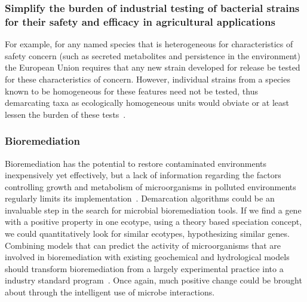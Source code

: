 \subsubsection*{Simplify the burden of industrial testing of bacterial strains for their safety and efficacy in agricultural applications}
For example, for any named species that is heterogeneous for characteristics of safety concern (such as secreted metabolites and persistence in the environment) the European Union requires that any new strain developed for release be tested for these characteristics of concern.
However, individual strains from a species known to be homogeneous for these features need not be tested, thus demarcating taxa as ecologically homogeneous units would obviate or at least lessen the burden of these tests~\cite{cohan2007systematics}.

\subsubsection*{Bioremediation}
Bioremediation has the potential to restore contaminated environments inexpensively yet effectively, but a lack of information regarding the factors controlling growth and metabolism of microorganisms in polluted environments regularly limits its implementation~\cite{lovley2003cleaning}.
Demarcation algorithms could be an invaluable step in the search for microbial bioremediation tools.
If we find a gene with a positive property in one ecotype, using a theory based speciation concept, we could quantitatively look for similar ecotypes, hypothesizing similar genes.
Combining models that can predict the activity of microorganisms that are involved in bioremediation with existing geochemical and hydrological models should transform bioremediation from a largely experimental practice into a industry standard program~\cite{lovley2003cleaning}.
Once again, much positive change could be brought about through the intelligent use of microbe interactions.

